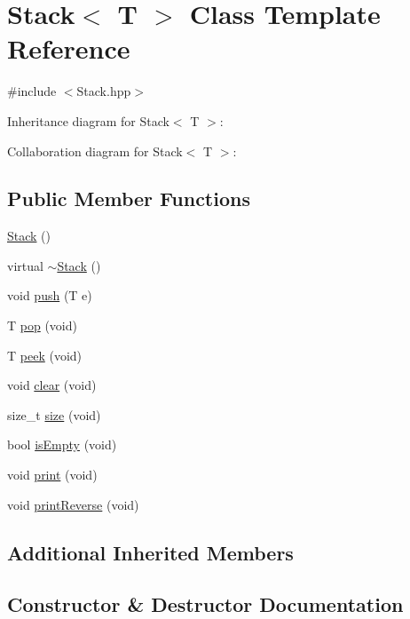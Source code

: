 \hypertarget{class_stack}{}\section{Stack$<$ T $>$ Class Template Reference}
\label{class_stack}


{\ttfamily \#include $<$Stack.\+hpp$>$}



Inheritance diagram for Stack$<$ T $>$\+:


Collaboration diagram for Stack$<$ T $>$\+:
\subsection*{Public Member Functions}
\begin{DoxyCompactItemize}
\item 
\hyperlink{class_stack_aefee698059467258bbd79045aca62a63}{Stack} ()
\item 
virtual \hyperlink{class_stack_a9e7a00875aefbdac560ab189b7bc61d1}{$\sim$\+Stack} ()
\item 
void \hyperlink{class_stack_ab9e4936dad73a983e9d8341c5a5c9da9}{push} (T e)
\item 
T \hyperlink{class_stack_a8d8f56937bf9f1af92ee19ae897bae29}{pop} (void)
\item 
T \hyperlink{class_stack_ad7412fe27cde6dd3013a67ea52b69022}{peek} (void)
\item 
void \hyperlink{class_stack_a3c61803e66a926722c554146c735891c}{clear} (void)
\item 
size\+\_\+t \hyperlink{class_stack_a5e9a5b47dd8394a745da9c587e79586a}{size} (void)
\item 
bool \hyperlink{class_stack_a42d11c2270f931a753c6104b18990688}{is\+Empty} (void)
\item 
void \hyperlink{class_stack_a8652de3a4bd4d24976ec3747d7237ed2}{print} (void)
\item 
void \hyperlink{class_stack_a81aeb2868a0e250e51af0bb015673672}{print\+Reverse} (void)
\end{DoxyCompactItemize}
\subsection*{Additional Inherited Members}


\subsection{Constructor \& Destructor Documentation}
\mbox{\label{class_stack_aefee698059467258bbd79045aca62a63}} 
